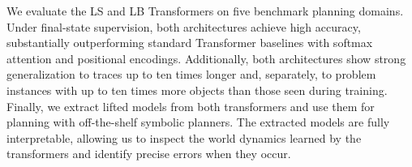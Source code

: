 We evaluate the LS and LB Transformers on five benchmark planning domains.
Under final-state supervision, both architectures achieve high accuracy, substantially outperforming standard Transformer baselines with softmax attention and positional encodings.
Additionally, both architectures show strong generalization to traces up to ten times longer and, separately, to problem instances with up to ten times more objects than those seen during training.
Finally, we extract lifted \strips models from both transformers and use them for planning with off-the-shelf symbolic planners.
The extracted models are fully interpretable, allowing us to inspect the world dynamics learned by the transformers and identify precise errors when they occur.




